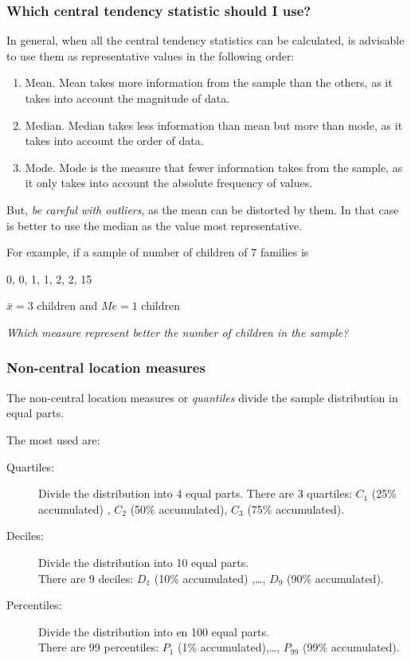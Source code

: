 \begin{frame}
\frametitle{Which central tendency statistic should I use?}
In general, when all the central tendency statistics can be calculated, is advisable to use them as representative
values in the following order:
\begin{enumerate}
\item Mean. Mean takes more information from the sample than the others, as it takes into account the magnitude
of data.
\item Median. Median takes less information than mean but more than mode, as it takes into account the order
of data.
\item Mode. Mode is the measure that fewer information takes from the sample, as it only takes into account the
absolute frequency of values.
\end{enumerate}

But, \emph{be careful with outliers}, as the mean can be distorted by them.
In that case is better to use the median as the value most representative.

For example, if a sample of number of children of 7 families is
\begin{center}
0, 0, 1, 1, 2, 2, 15

$\bar{x}=3$ children \quad and \quad $Me=1$ children

\emph{Which measure represent better the number of children in the sample?}
\end{center}
\end{frame}


\begin{frame}
\frametitle{Non-central location measures}
The non-central location measures or \emph{quantiles} divide the sample distribution in equal parts.

The most used are:
\begin{description}
\item[Quartiles:] Divide the distribution into 4 equal parts. 
There are 3 quartiles: $C_1$ (25\% accumulated) , $C_2$ (50\% accumulated), $C_3$ (75\% accumulated).
\item[Deciles:] Divide the distribution into 10 equal parts.\\
There are 9 deciles: $D_1$ (10\% accumulated) ,\ldots, $D_9$ (90\% accumulated).
\item[Percentiles:] Divide the distribution into en 100 equal parts.\\
There are 99 percentiles: $P_1$ (1\% accumulated),\ldots, $P_{99}$ (99\% accumulated).
\end{description}
\end{frame}


